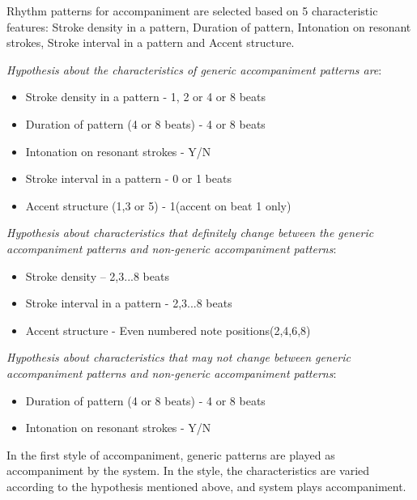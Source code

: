 
Rhythm patterns for accompaniment are selected based on 5 characteristic features: Stroke density in a pattern, Duration of pattern, Intonation on resonant strokes, Stroke interval in a pattern and Accent structure.


\emph{Hypothesis about the characteristics of generic accompaniment patterns are}:

\begin{itemize}
\item Stroke density in a pattern - 1, 2 or 4 or 8 beats
\item Duration of pattern (4 or 8 beats) - 4 or 8 beats
\item Intonation on resonant strokes - Y/N
\item Stroke interval in a pattern - 0 or 1 beats
\item Accent structure (1,3 or 5) - 1(accent on beat 1 only)

\end{itemize}

\emph{Hypothesis about characteristics that definitely change between the generic accompaniment patterns and non-generic accompaniment patterns}:

\begin{itemize}

\item Stroke density -- 2,3...8 beats
\item Stroke interval in a pattern - 2,3...8 beats
\item Accent structure - Even numbered note positions(2,4,6,8)

\end{itemize}

\emph{Hypothesis about characteristics that may not change between generic accompaniment patterns and non-generic accompaniment patterns}:

\begin{itemize}

\item Duration of pattern (4 or 8 beats) - 4 or 8 beats
\item Intonation on resonant strokes - Y/N

\end{itemize}

In the first style of accompaniment, generic patterns are played as accompaniment by the system. In the style, the characteristics are varied according to the hypothesis mentioned above, and system plays accompaniment.
